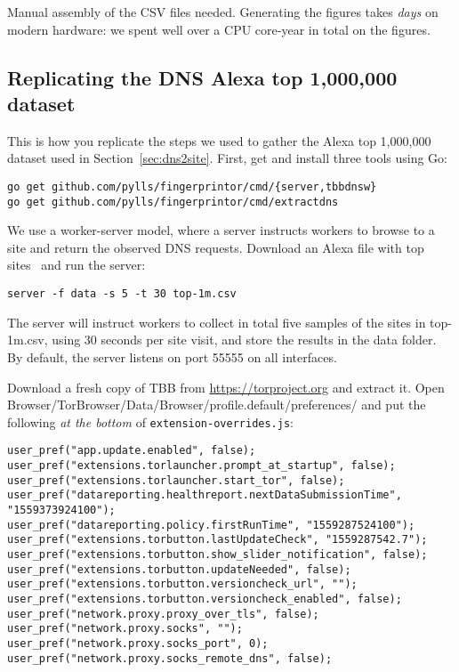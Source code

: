Manual assembly of the CSV files needed.
Generating the figures takes \emph{days} on modern
hardware: we spent well over a CPU core-year in total on the figures.

\subsection{Replicating the DNS Alexa top 1,000,000 dataset}
This is how you replicate the steps we used to gather the Alexa top 1,000,000
dataset used in Section~\ref{sec:dns2site}.
First, get and install three tools using Go:

\begin{lstlisting}
go get github.com/pylls/fingerprintor/cmd/{server,tbbdnsw}
go get github.com/pylls/fingerprintor/cmd/extractdns
\end{lstlisting}

We use a worker-server model, where a server instructs workers to browse to a
site and return the observed DNS requests. Download an Alexa file with top
sites~\cite{alexatop1k} and run the server:

\begin{lstlisting}
server -f data -s 5 -t 30 top-1m.csv
\end{lstlisting}
The server will instruct workers to collect in total
five samples of the sites in top-1m.csv, using 30 seconds per site visit,
and store the results in the data folder. By default, the server listens on
port 55555 on all interfaces.

Download a fresh copy of TBB from \url{https://torproject.org} and extract it.
Open Browser/TorBrowser/Data/Browser/profile.default/preferences/
and put the
following \emph{at the bottom} of \texttt{extension-overrides.js}:

\begin{lstlisting}
user_pref("app.update.enabled", false);
user_pref("extensions.torlauncher.prompt_at_startup", false);
user_pref("extensions.torlauncher.start_tor", false);
user_pref("datareporting.healthreport.nextDataSubmissionTime", "1559373924100");
user_pref("datareporting.policy.firstRunTime", "1559287524100");
user_pref("extensions.torbutton.lastUpdateCheck", "1559287542.7");
user_pref("extensions.torbutton.show_slider_notification", false);
user_pref("extensions.torbutton.updateNeeded", false);
user_pref("extensions.torbutton.versioncheck_url", "");
user_pref("extensions.torbutton.versioncheck_enabled", false);
user_pref("network.proxy.proxy_over_tls", false);
user_pref("network.proxy.socks", "");
user_pref("network.proxy.socks_port", 0);
user_pref("network.proxy.socks_remote_dns", false);
\end{lstlisting}

